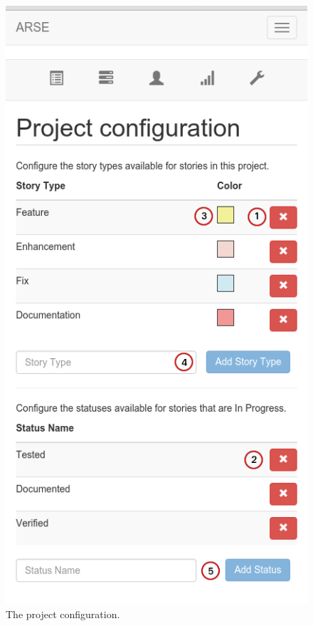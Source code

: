 \documentclass[
	accentcolor=tud1a %
]{tudreport}
\begin{document}
\begin{figure}[ht]
\centering
\begin{minipage}{.5\textwidth}
  \centering
	\includegraphics[height=28EM]{img/configuration}
	\caption{The project configuration.}
	\label{fig:project-config}
\end{minipage}%
\begin{minipage}{.5\textwidth}
	\centering

\end{minipage}
\end{figure}
\end{document}
